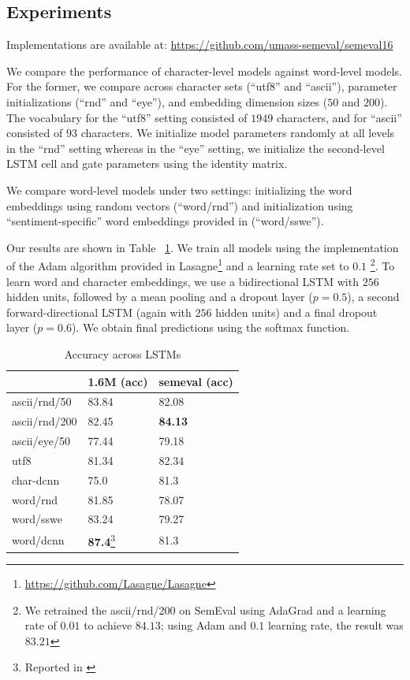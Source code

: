 \documentclass{article} %
\begin{document}
\subsection{Experiments}
Implementations are available at: \url{https://github.com/umass-semeval/semeval16}\

We compare the performance of character-level models against word-level models. For the former, we compare across character sets (``utf8'' and ``ascii''), parameter initializations (``rnd'' and ``eye''), and embedding dimension sizes ($50$ and $200$). The vocabulary for the ``utf8'' setting consisted of $1949$ characters, and for ``ascii'' consisted of $93$ characters. We initialize model parameters randomly at all levels in the ``rnd'' setting whereas in the ``eye'' setting, we initialize the second-level LSTM cell and gate parameters using the identity matrix.

We compare word-level models under two settings: initializing the word embeddings using random vectors (``word/rnd'') and initialization using ``sentiment-specific'' word embeddings provided in \cite{tang2014learning} (``word/sswe'').

Our results are shown in Table ~\ref{table:results}. We train all models using the implementation of the Adam algorithm \cite{kingma2014adam} provided in Lasagne\footnote{\url{https://github.com/Lasagne/Lasagne}} and a learning rate set to $0.1$ \footnote{We retrained the ascii/rnd/200 on SemEval using AdaGrad and a learning rate of $0.01$ to achieve $84.13$; using Adam and $0.1$ learning rate, the result was $83.21$}. To learn word and character embeddings, we use a bidirectional LSTM with $256$ hidden units, followed by a mean pooling and a dropout layer ($p=0.5$), a second forward-directional LSTM (again with $256$ hidden units) and a final dropout layer ($p=0.6$). We obtain final predictions using the softmax function.

\begin{table}[h!]
\centering
\caption{Accuracy across LSTMs}
\begin{tabular}{|l|ll|}
\hline
              & 1.6M (acc)          & semeval (acc) \\
\hline
ascii/rnd/50  & 83.84          & 82.08            \\
ascii/rnd/200 & 82.45          & \textbf{84.13}   \\
ascii/eye/50  & 77.44          & 79.18   \\
utf8          & 81.34          & 82.34   \\
char-dcnn     & 75.0           & 81.3    \\
word/rnd      & 81.85          & 78.07   \\
word/sswe     & 83.24          & 79.27   \\
word/dcnn     & \textbf{87.4}\footnote{Reported in \cite{kalchbrenner2014convolutional}}           & 81.3    \\
\hline
\end{tabular}
\label{table:results}
\end{table}
\end{document}
